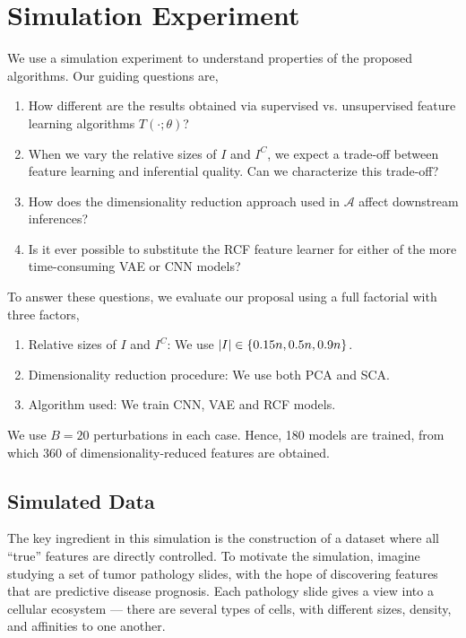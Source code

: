
\section{Simulation Experiment}
\label{sec:simulation}

We use a simulation experiment to understand properties of the proposed
algorithms. Our guiding questions are,

\begin{enumerate}[label=(G{{\arabic*}})]
\item How different are the results obtained via supervised vs. unsupervised
  feature learning algorithms $T\left(\cdot; \theta\right)$?
\item When we vary the relative sizes of $I$ and $I^{C}$, we expect a trade-off
  between feature learning and inferential quality. Can we characterize this
  trade-off?
\item How does the dimensionality reduction approach used in $\mathcal{A}$
  affect downstream inferences?
\item Is it ever possible to substitute the RCF feature learner for either of
  the more time-consuming VAE or CNN models?
\end{enumerate}

To answer these questions, we evaluate our proposal using a full factorial with
three factors,

\begin{enumerate}
\item Relative sizes of $I$ and $I^{C}$: We use $\left|I\right| \in \left\{0.15n,
  0.5n, 0.9n\right\}$.
\item Dimensionality reduction procedure: We use both PCA and SCA.
\item Algorithm used: We train CNN, VAE and RCF models.
\end{enumerate}

We use $B = 20$ perturbations in each case. Hence, 180 models are trained, from
which 360 of dimensionality-reduced features are obtained.

\subsection{Simulated Data}

The key ingredient in this simulation is the construction of a dataset where all
``true'' features are directly controlled. To motivate the simulation, imagine
studying a set of tumor pathology slides, with the hope of discovering features
that are predictive disease prognosis. Each pathology slide gives a view into a
cellular ecosystem — there are several types of cells, with different sizes,
density, and affinities to one another.

